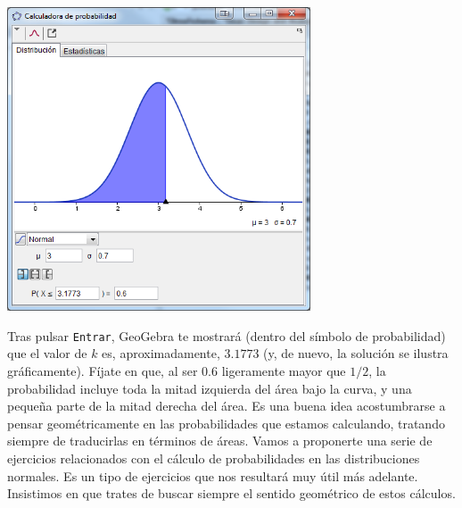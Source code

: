 \documentclass[10pt,a4paper]{article}\usepackage[]{graphicx}\usepackage[]{color}
\begin{document}
\begin{center}
\includegraphics[width=9cm]{../fig/Tut05-61.png}
\end{center}
Tras pulsar {\tt Entrar}, GeoGebra te mostrará (dentro del símbolo de probabilidad) que el valor de $k$ es, aproximadamente, $3.1773$ (y, de nuevo, la solución se ilustra gráficamente). Fíjate en que, al ser $0.6$ ligeramente mayor que $1/2$, la probabilidad incluye toda la mitad izquierda del área bajo la curva, y una pequeña parte de la mitad derecha del área. Es una buena idea acostumbrarse a pensar geométricamente en las probabilidades que estamos calculando, tratando siempre de traducirlas en términos de áreas. Vamos a proponerte una serie de ejercicios relacionados con el cálculo de probabilidades en las distribuciones normales. Es un tipo de ejercicios que nos resultará muy útil más adelante. Insistimos en que trates de buscar siempre el sentido geométrico de estos cálculos.
\end{document}
